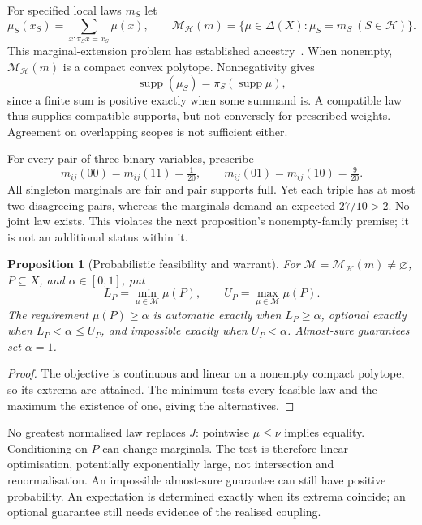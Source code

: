 \documentclass[11pt]{article}
\newtheorem{proposition}[theorem]{Proposition}
\newcommand{\cH}{\mathcal H}
\newcommand{\cM}{\mathcal M}
\newcommand{\supp}{\operatorname{supp}}
\begin{document}
For specified local laws $m_S$ let
\begin{equation}\label{eq:marginal}
\mu_S(x_S)=\sum_{x:\pi_Sx=x_S}\mu(x),\qquad
\cM_{\cH}(m)=\{\mu\in\Delta(X):\mu_S=m_S\ (S\in\cH)\}.
\end{equation}
This marginal-extension problem has established ancestry~\cite{vorobev}. When nonempty, $\cM_{\cH}(m)$ is a compact convex polytope. Nonnegativity gives
\begin{equation}\label{eq:support}
\supp(\mu_S)=\pi_S(\supp\mu),
\end{equation}
since a finite sum is positive exactly when some summand is. A compatible law thus supplies compatible supports, but not conversely for prescribed weights. Agreement on overlapping scopes is not sufficient either.

For every pair of three binary variables, prescribe
\begin{equation}\label{eq:incompatible}
m_{ij}(00)=m_{ij}(11)=\tfrac1{20},\qquad
m_{ij}(01)=m_{ij}(10)=\tfrac9{20}.
\end{equation}
All singleton marginals are fair and pair supports full. Yet each triple has at most two disagreeing pairs, whereas the marginals demand an expected $27/10>2$. No joint law exists. This violates the next proposition's nonempty-family premise; it is not an additional status within it.

\begin{proposition}[Probabilistic feasibility and warrant]\label{prop:probability}
For $\cM=\cM_{\cH}(m)\ne\varnothing$, $P\subseteq X$, and $\alpha\in[0,1]$, put
\begin{equation}\label{eq:bounds}
L_P=\min_{\mu\in\cM}\mu(P),\qquad U_P=\max_{\mu\in\cM}\mu(P).
\end{equation}
The requirement $\mu(P)\geq\alpha$ is automatic exactly when $L_P\geq\alpha$, optional exactly when $L_P<\alpha\leq U_P$, and impossible exactly when $U_P<\alpha$. Almost-sure guarantees set $\alpha=1$.
\end{proposition}
\begin{proof}
The objective is continuous and linear on a nonempty compact polytope, so its extrema are attained. The minimum tests every feasible law and the maximum the existence of one, giving the alternatives.
\end{proof}
No greatest normalised law replaces $J$: pointwise $\mu\leq\nu$ implies equality. Conditioning on $P$ can change marginals. The test is therefore linear optimisation, potentially exponentially large, not intersection and renormalisation. An impossible almost-sure guarantee can still have positive probability. An expectation is determined exactly when its extrema coincide; an optional guarantee still needs evidence of the realised coupling.
\end{document}
